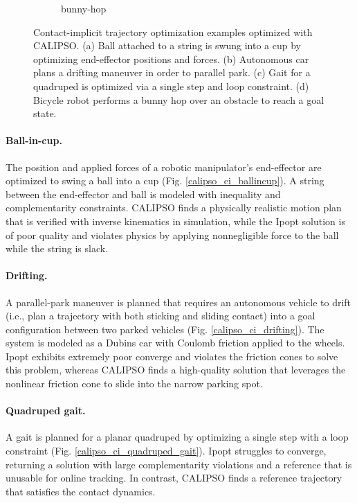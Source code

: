 \begin{figure}[H]
\begin{subfigure}{.495\textwidth}
		\caption{bunny-hop}
		\label{calipso_ci_bunnyhop}
	\end{subfigure}
	\caption[Contact-implicit trajectory optimization examples]{Contact-implicit trajectory optimization examples optimized with CALIPSO. (a) Ball attached to a string is swung into a cup by optimizing end-effector positions and forces. (b) Autonomous car plans a drifting maneuver in order to parallel park. (c) Gait for a quadruped is optimized via a single step and loop constraint. (d) Bicycle robot performs a bunny hop over an obstacle to reach a goal state.}
	\label{calipso_ci_examples}
\end{figure}

\paragraph{Ball-in-cup.} The position and applied forces of a robotic manipulator's end-effector are optimized to swing a ball into a cup (Fig. \ref{calipso_ci_ballincup}). A string between the end-effector and ball is modeled with inequality and complementarity constraints. CALIPSO finds a physically realistic motion plan that is verified with inverse kinematics in simulation, while the Ipopt solution is of poor quality and violates physics by applying nonnegligible force to the ball while the string is slack.

\paragraph{Drifting.}
A parallel-park maneuver is planned that requires an autonomous vehicle to drift (i.e., plan a trajectory with both sticking and sliding contact) into a goal configuration between two parked vehicles (Fig. \ref{calipso_ci_drifting}). The system is modeled as a Dubins car \cite{lavalle2006planning} with Coulomb friction applied to the wheels. Ipopt exhibits extremely poor converge and violates the friction cones to solve this problem, whereas CALIPSO finds a high-quality solution that leverages the nonlinear friction cone to slide into the narrow parking spot.

\paragraph{Quadruped gait.} 
A gait is planned for a planar quadruped by optimizing a single step with a loop constraint (Fig. \ref{calipso_ci_quadruped_gait}). Ipopt struggles to converge, returning a solution with large complementarity violations and a reference that is unusable for online tracking. In contrast, CALIPSO finds a reference trajectory that satisfies the contact dynamics.

